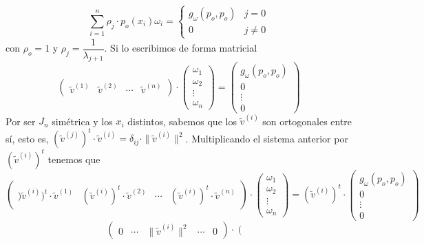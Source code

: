 \begin{met}
$$\sum_{i=1}^n \rho_j\cdot p_o(x_i)\omega_i=\left\{ 
\begin{array}{cc}
   g_{\omega}(p_o,p_o)   &  j=0 \\
    0 & j\neq 0 
\end{array}\right.  $$
 con $\rho_o=1$ y $\rho_j=\dfrac{1}{\lambda_{j+1}}$. Si lo escribimos de forma matricial
 $$\left(\begin{array}{c|c|c|c}
      \tilde{v}^{(1)} & \tilde{v}^{(2)} &\cdots & \tilde{v}^{(n)} 
 \end{array}\right)\cdot \left(\begin{array}{c}
     \omega_1 \\
      \omega_2\\
      \vdots\\
      \omega_n
\end{array}\right)=\left(\begin{array}{c}
     g_{\omega}(p_o,p_o) \\
     0\\
      \vdots\\
      0
\end{array}\right) $$
Por ser $J_n$ simétrica y los $x_i$ distintos, sabemos que los $\tilde{v}^{(i)}$ son ortogonales entre sí, esto es, $(\tilde{v}^{(j)})^t\cdot\tilde{v}^{(i)}=\delta_{ij}\cdot \|\tilde{v}^{(i)}\|^2 $. Multiplicando el sistema anterior por $(\tilde{v}^{(i)})^t$ tenemos que
 $$\left(\begin{array}{c|c|c|c}
     )\tilde{v}^{(i)})^t\cdot  \tilde{v}^{(1)} &(\tilde{v}^{(i)})^t\cdot  \tilde{v}^{(2)} &\cdots &(\tilde{v}^{(i)} )^t\cdot \tilde{v}^{(n)} 
 \end{array}\right)\cdot \left(\begin{array}{c}
     \omega_1 \\
      \omega_2\\
      \vdots\\
      \omega_n
\end{array}\right)=(\tilde{v}^{(i)})^t\cdot \left(\begin{array}{c}
     g_{\omega}(p_o,p_o) \\
     0\\
      \vdots\\
      0
\end{array}\right) $$
 $$\left(\begin{array}{c|c|c|c|c}
     0 &\cdots  &\|\tilde{v}^{(i)}\|^2&\cdots&0 
 \end{array}\right)\cdot \left(\begin{array}{c}

\end{array}$$
\end{met}
